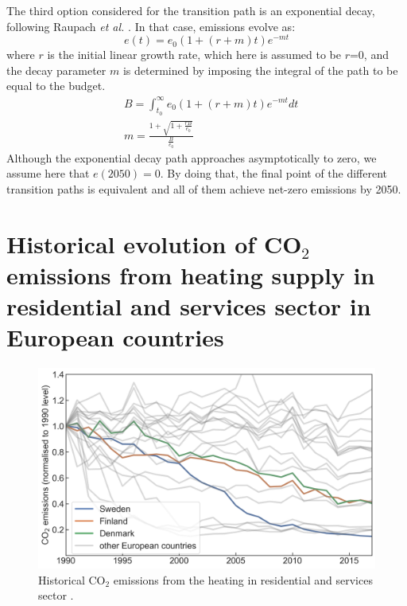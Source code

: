\documentclass[3p]{elsarticle} %
\begin{document}
The third option considered for the transition path is an exponential decay, following Raupach \textit{et al. }\cite{Raupach_2014}. In that case, emissions evolve as:
\begin{equation}
e(t) = e_0(1+(r+m)t)e^{-mt}
\end{equation}
where $r$ is the initial linear growth rate, which here is assumed to be $r$=0, and the decay parameter $m$ is determined by imposing the integral of the path to be equal to the budget.
\begin{equation}
\begin{aligned}
& B=\int_{t_0}^{\infty} e_0(1+(r+m)t)e^{-mt} dt \\
& m=\frac{1+ \sqrt{1+\frac{rB}{e_0}}}{\frac{B}{e_0}}
\end{aligned}
\end{equation}
Although the exponential decay path approaches asymptotically to zero, we assume here that $e(2050)=0$. By doing that, the final point of the different transition paths is equivalent and all of them achieve net-zero emissions by 2050.

\FloatBarrier

\newpage

\section{Historical evolution of CO$_2$ emissions from heating supply in residential and services sector in European countries}

\begin{figure}[!h]
\centering
\includegraphics[width=12cm]{figures/emissions_heating.png}
\caption{Historical CO$_2$ emissions from the heating in residential and services sector \cite{UNFCCC_inventory}. } \label{fig_emissions_heating} 
\end{figure}
\end{document}
